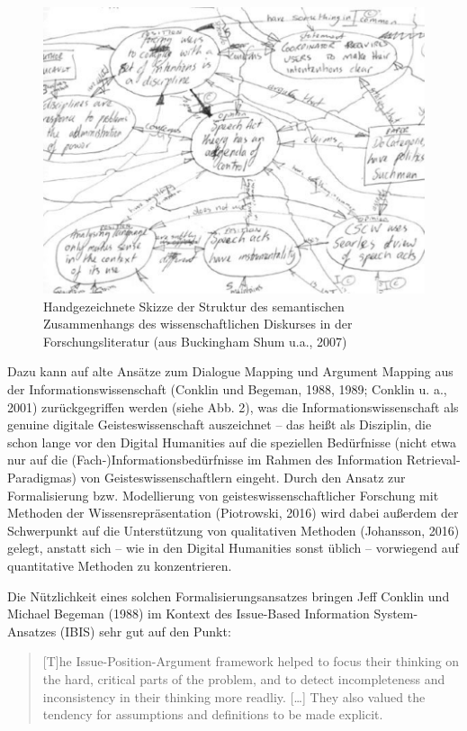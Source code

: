 \documentclass[a4paper,
fontsize=11pt,
oneside,
numbers=noperiodatend,
parskip=half-,
bibliography=totoc,
final
]{scrartcl}
\begin{document}
\begin{figure}
\centering
\includegraphics{img/abb2.png}
\caption{Handgezeichnete Skizze der Struktur des semantischen
Zusammenhangs des wissenschaftlichen Diskurses in der
Forschungsliteratur (aus Buckingham Shum u.a., 2007)}
\end{figure}

Dazu kann auf alte Ansätze zum Dialogue Mapping und Argument Mapping aus
der Informationswissenschaft (Conklin und Begeman, 1988, 1989; Conklin
u. a., 2001) zurückgegriffen werden (siehe Abb. 2), was die
Informationswissenschaft als genuine digitale Geisteswissenschaft
auszeichnet -- das heißt als Disziplin, die schon lange vor den Digital
Humanities auf die speziellen Bedürfnisse (nicht etwa nur auf die
(Fach-)Informationsbedürfnisse im Rahmen des Information
Retrieval-Paradigmas) von Geisteswissenschaftlern eingeht. Durch den
Ansatz zur Formalisierung bzw. Modellierung von
geisteswissenschaftlicher Forschung mit Methoden der
Wissensrepräsentation (Piotrowski, 2016) wird dabei außerdem der
Schwerpunkt auf die Unterstützung von qualitativen Methoden (Johansson,
2016) gelegt, anstatt sich -- wie in den Digital Humanities sonst üblich
-- vorwiegend auf quantitative Methoden zu konzentrieren.

Die Nützlichkeit eines solchen Formalisierungsansatzes bringen Jeff
Conklin und Michael Begeman (1988) im Kontext des Issue-Based
Information System- Ansatzes (IBIS) sehr gut auf den Punkt:

\begin{quote}
{[}T{]}he Issue-Position-Argument framework helped to focus their
thinking on the hard, critical parts of the problem, and to detect
incompleteness and inconsistency in their thinking more readliy.
{[}\ldots{}{]} They also valued the tendency for assumptions and
definitions to be made explicit.
\end{quote}
\end{document}
